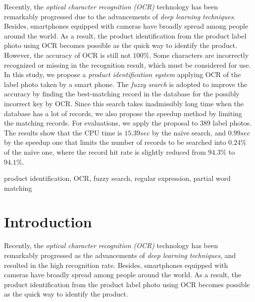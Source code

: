 \documentclass[technicalreport]{ieicej}
\begin{document}

\begin{eabstract}
    Recently, the {\em optical character recognition (OCR)} technology has been remarkably progressed due to the advancements of {\em deep learning techniques}. Besides, smartphones equipped with cameras have broadly spread among people around the world. As a result, the product identification from the product label photo using OCR becomes possible as the quick way to identify the product.
    However, the accuracy of OCR is still not $100\%$. Some characters are incorrectly recognized or missing in the recognition result, which must be considered for use. 
    In this study, we propose a {\em product identification system} applying OCR of the label photo taken by a smart phone. The {\em fuzzy search} is adopted to improve the accuracy by finding the best-matching record in the database for the possibly incorrect key by OCR. Since this search takes inadmissibly long time when the database has a lot of records, we also propose the speedup method by limiting the matching records. 
    For evaluations, we apply the proposal to $389$ label photos. The results show that the CPU time is $15.39sec$ by the naïve search, and $0.99sec$ by the speedup one that limits the number of records to be searched into $0.24\%$ of the naïve one, where the record hit rate is slightly reduced from $94.3\%$ to $94.1\%$.
\end{eabstract}

\begin{ekeyword}
product identification, OCR, fuzzy search, regular expression, partial word matching
\end{ekeyword}
\maketitle

\section{Introduction}
    Recently, the {\em optical character recognition (OCR)} technology has been remarkably progressed as the advancements of {\em deep learning techniques}, and resulted in the high recognition rate. Besides, smartphones equipped with cameras have broadly spread among people around the world. As a result, the product identification from the product label photo using OCR becomes possible as the quick way to identify the product.
\end{document}
